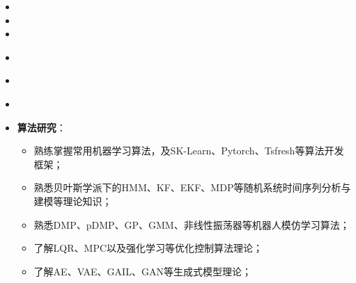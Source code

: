   \begin{itemize}[leftmargin=*]
    \item
    \item
    \item
  \end{itemize}
  

\vspace{-2mm}
\begin{itemize}[leftmargin=*]
  \item {}
\end{itemize}

\vspace{-2mm}
\begin{itemize}[leftmargin=*]
  \item {}
\end{itemize}

\vspace{-2mm}
\begin{itemize}[leftmargin=*]
  \item {}
\end{itemize}

\vspace{-2mm}
\begin{itemize}[leftmargin=*]
  \item \textbf{算法研究}：
  {\small
  \begin{itemize}
    \item 熟练掌握常用机器学习算法，及SK-Learn、Pytorch、Tsfresh等算法开发框架；
    \item 熟悉贝叶斯学派下的HMM、KF、EKF、MDP等随机系统时间序列分析与建模等理论知识；
    \item 熟悉DMP、pDMP、GP、GMM、非线性振荡器等机器人模仿学习算法；
    \item 了解LQR、MPC以及强化学习等优化控制算法理论；
    \item 了解AE、VAE、GAIL、GAN等生成式模型理论；
  \end{itemize}}
\end{itemize}

